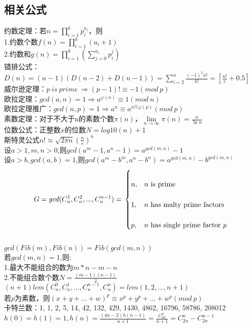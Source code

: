 \documentclass[a4paper]{article}
\begin{document}
\subsection{相关公式}
约数定理：若$n=\prod_{i=1}^kp_i^{a_i}$，则 \\
1.约数个数$f(n)=\prod_{i=1}^k(a_i+1)$ \\
2.约数和$g(n)=\prod_{i=1}^k(\sum_{j=0}^{a_i}p_i^j)$ \\
错排公式：$D(n)=(n-1)(D(n-2)+D(n-1))=\sum_{i=2}^n\frac{(-1)^kn!}{k!}=[\frac{n!}{e}+0.5]$ \\
威尔逊定理：$p\ is\ prime\ \Rightarrow (p-1)!\equiv-1(mod\ p)$ \\
欧拉定理：$gcd(a,n)=1\Rightarrow a^{\varphi(n)}\equiv1(mod\ n)$ \\
欧拉定理推广：$gcd(n,p)=1\Rightarrow a^n\equiv a^{n\%\varphi(p)}(mod\ p)$ \\
素数定理：对于不大于n的素数个数$\pi(n)$，$\lim\limits_{n\to\infty}\pi(n)=\frac{n}{\ln n}$ \\
位数公式：正整数$x$的位数$N=log10(n)+1$ \\
斯特灵公式$n!\approx\sqrt{2\pi n}(\frac{n}{e})^n$ \\
设$a>1,m,n>0$,则$gcd(a^m-1,a^n-1)=a^{gcd(m,n)}-1$ \\
设$a>b,gcd(a,b)=1$,则$gcd(a^m-b^m,a^n-b^n)=a^{gcd(m,n)}-b^{gcd(m,n)}$ \\
$$ \\
G=gcd(C_n^1,C_n^2,...,C_n^{n-1})= \\
\begin{cases} \\
	n, & \text{$n$ is prime} \\ \\
	1, & \text{$n$ has multy prime factors} \\ \\
	p, & \text{$n$ has single prime factor $p$}  \\
\end{cases} \\
$$ \\
$gcd(Fib(m),Fib(n))=Fib(gcd(m,n))$ \\
若$gcd(m,n)=1$,则: \\
1.最大不能组合的数为$m*n-m-n$ \\
2.不能组合数个数$N=\frac{(m-1)(n-1)}{2}$ \\
$(n+1)lcm(C_n^0,C_n^1,...,C_n^{n-1},C_n^{n})=lcm(1,2,...,n+1)$ \\
若$p$为素数，则$(x+y+...+w)^p\equiv x^p+y^p+...+w^p(mod\ p)$ \\
卡特兰数：1, 1, 2, 5, 14, 42, 132, 429, 1430, 4862, 16796, 58786, 208012 \\
$h(0)=h(1)=1,h(n)=\frac{(4n-2)h(n-1)}{n+1}=\frac{C_{2n}^n}{n+1}=C_{2n}^n-C_{2n}^{n-1}$\clearpage
\end{document}
